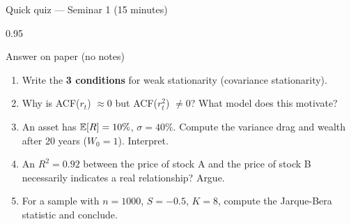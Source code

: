 \documentclass[9pt, aspectratio=169, t]{beamer}
\begin{document}
\begin{frame}[shrink=3]{Quick quiz --- Seminar 1 (15 minutes)}
    \begin{cminipage}{0.95\textwidth}
    \begin{alertblock}{Answer on paper (no notes)}
    \begin{enumerate}\setlength{\itemsep}{0pt}
        \item Write the \textbf{3 conditions} for weak stationarity (covariance stationarity).
        \vspace{0.08cm}
        \item Why is ACF($r_t$) $\approx 0$ but ACF($r_t^2$) $\neq 0$? What model does this motivate?
        \vspace{0.08cm}
        \item An asset has $\mathbb{E}[R] = 10\%$, $\sigma = 40\%$. Compute the variance drag and wealth after 20 years ($W_0 = 1$). Interpret.
        \vspace{0.08cm}
        \item An $R^2 = 0.92$ between the price of stock A and the price of stock B necessarily indicates a real relationship? Argue.
        \vspace{0.08cm}
        \item For a sample with $n = 1000$, $S = -0.5$, $K = 8$, compute the Jarque-Bera statistic and conclude.
    \end{enumerate}
    \end{alertblock}
    \end{cminipage}
\end{frame}
\end{document}

